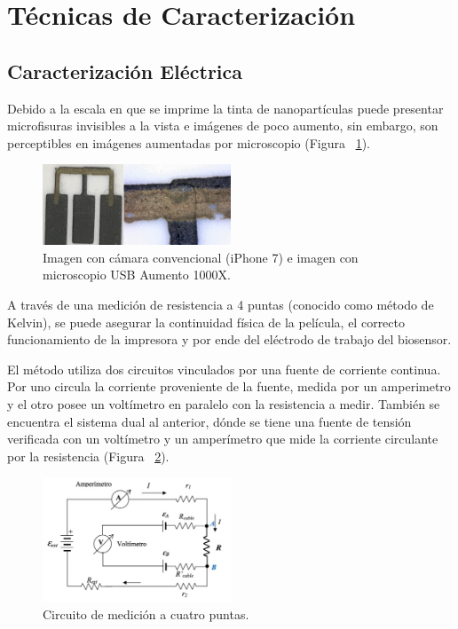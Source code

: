 \section{T\'ecnicas de Caracterizaci\'on}
\subsection{Caracterizaci\'on El\'ectrica}\label{subsec:carac_elec}
Debido a la escala en que se imprime la tinta de nanopartículas puede presentar microfisuras invisibles a la vista e imágenes de poco aumento, sin embargo, son perceptibles en imágenes aumentadas por microscopio (Figura ~\ref{fig:Figura_Carac_elec}).

\begin{figure}[H]
  \centering
    \includegraphics[width=0.5\textwidth]{Figuras/Figura_Carac_elec}
  \caption{Imagen con cámara convencional (iPhone 7) e imagen con microscopio USB Aumento 1000X.}
  \label{fig:Figura_Carac_elec}
\end{figure}

A través de una medición de resistencia a 4 puntas (conocido como método de Kelvin), se puede asegurar la continuidad física de la película, el correcto funcionamiento de la impresora y por ende del eléctrodo de trabajo del biosensor.

El método utiliza dos circuitos vinculados por una fuente de corriente continua. Por uno circula la corriente proveniente de la fuente, medida por un amperimetro y el otro posee un voltímetro en paralelo con la resistencia a medir. También se encuentra el sistema dual al anterior, dónde se tiene una fuente de tensión verificada con un voltímetro y un amperímetro que mide la corriente circulante por la resistencia (Figura ~\ref{fig:Figura_metodo_Kelvin}).

\begin{figure}[H]
  \centering
    \includegraphics[width=0.5\textwidth]{Figuras/Figura_metodo_Kelvin}
  \caption{Circuito de medición a cuatro puntas.}
  \label{fig:Figura_metodo_Kelvin}
\end{figure}


